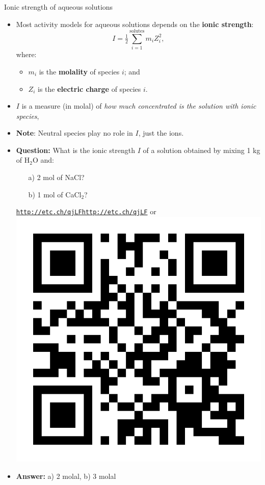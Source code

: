 \begin{frame}{Ionic strength of aqueous solutions}
%
\lcol
\begin{itemize}
\item Most activity models for aqueous solutions depends on the  \alert{\textbf{ionic strength}}:
\[
\boxed{I=\tfrac{1}{2}\sum_{i=1}^{\text{solutes}}m_{i}Z_{i}^{2}},
\]
where:
\begin{itemize}
\item $m_{i}$ is the \textbf{molality} of species $i$; and
\item $Z_{i}$ is the \textbf{electric charge }of species $i$.
\end{itemize}
\pause
\item $I$ is a measure (in molal) of \emph{how much concentrated is the solution with ionic
species}, 
\item \textbf{Note}: \alert{Neutral species} play no role in $I$, just the ions.
\end{itemize}
\rcol
\begin{itemize}
	\pause
\item \alert{\textbf{Question:}} What is the ionic strength $I$ of a solution obtained
by mixing 1 kg of H$_{2}$O and:
\begin{itemize}
\item[a)] 2 mol of NaCl?
\item[b)] 1 mol of CaCl$_{2}$?
\end{itemize}
\vskip 5pt
\begin{center}
\href{http://etc.ch/qjLF}{\textcolor{indigo(dye)}{\tt http://etc.ch/qjLFhttp://etc.ch/qjLF}} or 
\includegraphics[height=0.45\columnwidth]{figures/activity-models/poll-ionic-strength.png}
\end{center}
\hiddenpause
\item \textbf{Answer:}
a) 2 molal, 
b) 3 molal
\end{itemize}
\ecol
\end{frame}
%
